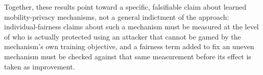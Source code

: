 Together, these results point toward a specific, falsifiable claim
about learned mobility-privacy mechanisms, not a general indictment of
the approach: individual-fairness claims about such a mechanism must be
measured at the level of who is actually protected using an attacker
that cannot be gamed by the mechanism's own training objective, and a
fairness term added to fix an uneven mechanism must be checked against
that same measurement before its effect is taken as improvement.
